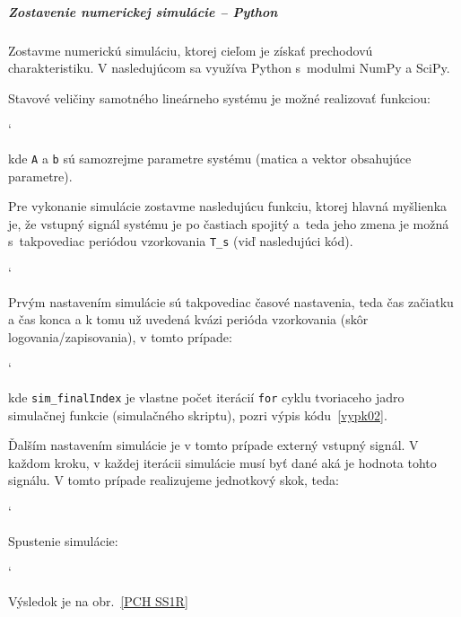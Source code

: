 \documentclass[a4paper, 10pt, ]{article}
\begin{document}
\subparagraph{Zostavenie numerickej simulácie -- Python}

Zostavme numerickú simuláciu, ktorej cieľom je získať prechodovú charakteristiku. V nasledujúcom sa využíva Python s~modulmi NumPy a SciPy.

Stavové veličiny samotného lineárneho systému je možné realizovať funkciou:
{\catcode`

}
\noindent
kde \lstinline|A| a \lstinline|b| sú samozrejme parametre systému (matica a vektor obsahujúce parametre).

Pre vykonanie simulácie zostavme nasledujúcu funkciu, ktorej hlavná myšlienka je, že vstupný signál systému je po častiach spojitý a~teda jeho zmena je možná s~takpovediac periódou vzorkovania \lstinline|T_s| (viď nasledujúci kód).
{\catcode`

}


Prvým nastavením simulácie sú takpovediac časové nastavenia, teda čas začiatku a čas konca a k tomu už uvedená kvázi perióda vzorkovania (skôr logovania/zapisovania), v tomto prípade:
{\catcode`

}
\noindent
kde \lstinline|sim_finalIndex| je vlastne počet iterácií \lstinline|for| cyklu tvoriaceho jadro simulačnej funkcie (simulačného skriptu), pozri výpis kódu~\ref{vypk02}.

Ďalším nastavením simulácie je v tomto prípade externý vstupný signál. V každom kroku, v každej iterácii simulácie musí byť dané aká je hodnota tohto signálu.  V tomto prípade realizujeme jednotkový skok, teda:
{\catcode`

}
\noindent



Spustenie simulácie:
{\catcode`

}
\noindent
Výsledok je na obr.~\ref{PCH SS1R}
\end{document}
